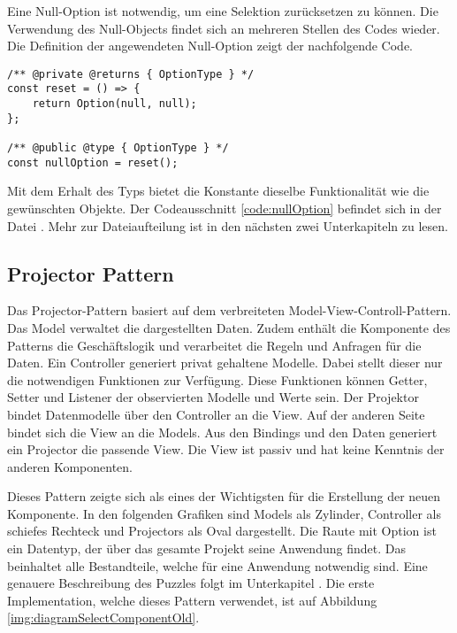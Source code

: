 Eine Null-Option ist notwendig, um eine Selektion zurücksetzen zu können. 
Die Verwendung des Null-Objects findet sich an mehreren Stellen des Codes wieder. 
Die Definition der angewendeten Null-Option zeigt der nachfolgende Code. 

\begin{lstlisting}[style = htmlcssjs, caption = Null-Option Definition, label = code:nullOption]
/** @private @returns { OptionType } */
const reset = () => {
    return Option(null, null);
};

/** @public @type { OptionType } */
const nullOption = reset();
\end{lstlisting}

Mit dem Erhalt des Typs  bietet die Konstante dieselbe Funktionalität wie die gewünschten Objekte. 
Der Codeausschnitt \ref{code:nullOption} befindet sich in der Datei . 
Mehr zur Dateiaufteilung ist in den nächsten zwei Unterkapiteln zu lesen. 


\subsection{Projector Pattern}
\label{sec:projectorPattern}

Das Projector-Pattern basiert auf dem verbreiteten Model-View-Controll-Pattern. 
Das Model verwaltet die dargestellten Daten. 
Zudem enthält die Komponente des Patterns die Geschäftslogik und verarbeitet die Regeln und Anfragen für die Daten. 
Ein Controller generiert privat gehaltene Modelle. 
Dabei stellt dieser nur die notwendigen Funktionen zur Verfügung. 
Diese Funktionen können Getter, Setter und Listener der observierten Modelle und Werte sein. 
Der Projektor bindet Datenmodelle über den Controller an die View. 
Auf der anderen Seite bindet sich die View an die Models. 
Aus den Bindings und den Daten generiert ein Projector die passende View. 
Die View ist passiv und hat keine Kenntnis der anderen Komponenten. 

Dieses Pattern zeigte sich als eines der Wichtigsten für die Erstellung der neuen Komponente. 
In den folgenden Grafiken sind Models als Zylinder, Controller als schiefes Rechteck und Projectors als Oval dargestellt. 
Die Raute mit Option ist ein Datentyp, der über das gesamte Projekt seine Anwendung findet. 
Das  beinhaltet alle Bestandteile, welche für eine Anwendung notwendig sind. 
Eine genauere Beschreibung des Puzzles folgt im Unterkapitel \textbf{}. 
Die erste Implementation, welche dieses Pattern verwendet, ist auf Abbildung \ref{img:diagramSelectComponentOld}. 

